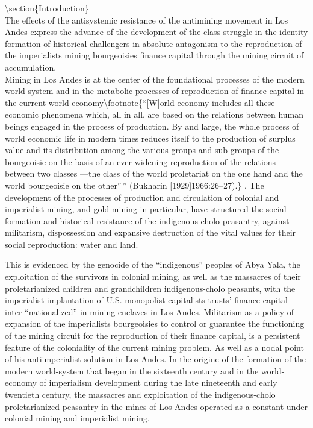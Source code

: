 \documentclass[
]{article}
\begin{document}
\textbackslash section\{Introduction\}\\
The effects of the antisystemic resistance of the antimining movement in
Los Andes express the advance of the development of the class struggle
in the identity formation of historical challengers in absolute
antagonism to the reproduction of the imperialists mining bourgeoisies
finance capital through the mining circuit of accumulation.\\
Mining in Los Andes is at the center of the foundational processes of
the modern world-system and in the metabolic processes of reproduction
of finance capital in the current
world-economy\textbackslash footnote\{``{[}W{]}orld economy includes all
these economic phenomena which, all in all, are based on the relations
between human beings engaged in the process of production. By and large,
the whole process of world economic life in modern times reduces itself
to the production of surplus value and its distribution among the
various groups and sub-groups of the bourgeoisie on the basis of an ever
widening reproduction of the relations between two classes ---the class
of the world proletariat on the one hand and the world bourgeoisie on
the other''\,'' (Bukharin {[}1929{]}1966:26--27).\} . The development of
the processes of production and circulation of colonial and imperialist
mining, and gold mining in particular, have structured the social
formation and historical resistance of the indigenous-cholo peasantry,
against militarism, dispossession and expansive destruction of the vital
values for their social reproduction: water and land.

This is evidenced by the genocide of the ``indigenous'' peoples of Abya
Yala, the exploitation of the survivors in colonial mining, as well as
the massacres of their proletarianized children and grandchildren
indigenous-cholo peasants, with the imperialist implantation of U.S.
monopolist capitalists trusts' finance capital inter-``nationalized'' in
mining enclaves in Los Andes. Militarism as a policy of expansion of the
imperialists bourgeoisies to control or guarantee the functioning of the
mining circuit for the reproduction of their finance capital, is a
persistent feature of the coloniality of the current mining problem. As
well as a nodal point of his antiimperialist solution in Los Andes. In
the origine of the formation of the modern world-system that began in
the sixteenth century and in the world-economy of imperialism
development during the late nineteenth and early twentieth century, the
massacres and exploitation of the indigenous-cholo proletarianized
peasantry in the mines of Los Andes operated as a constant under
colonial mining and imperialist mining.
\end{document}
